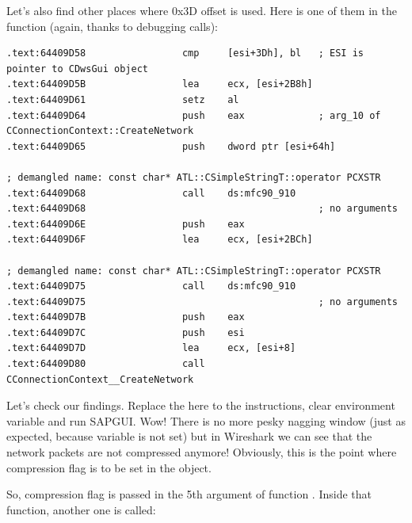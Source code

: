 {Let's also find other places where 0x3D offset is used. 
Here is one of them in the  function (again, thanks to debugging calls):}

\begin{lstlisting}
.text:64409D58                 cmp     [esi+3Dh], bl   ; ESI is pointer to CDwsGui object
.text:64409D5B                 lea     ecx, [esi+2B8h]
.text:64409D61                 setz    al
.text:64409D64                 push    eax             ; arg_10 of CConnectionContext::CreateNetwork
.text:64409D65                 push    dword ptr [esi+64h]

; demangled name: const char* ATL::CSimpleStringT::operator PCXSTR 
.text:64409D68                 call    ds:mfc90_910
.text:64409D68                                         ; no arguments
.text:64409D6E                 push    eax
.text:64409D6F                 lea     ecx, [esi+2BCh]

; demangled name: const char* ATL::CSimpleStringT::operator PCXSTR 
.text:64409D75                 call    ds:mfc90_910
.text:64409D75                                         ; no arguments
.text:64409D7B                 push    eax
.text:64409D7C                 push    esi
.text:64409D7D                 lea     ecx, [esi+8]
.text:64409D80                 call    CConnectionContext__CreateNetwork
\end{lstlisting}

{Let's check our findings. Replace the  here to the  instructions,
clear \TDWNC 
environment variable and run SAPGUI. Wow! There is no more pesky nagging window (just as expected, 
because variable is not set) but in Wireshark we can see that the network packets are not compressed anymore! 
Obviously, this is the point where compression flag is to be set in the  object.}

{So, compression flag is passed in the 5th argument of function . 
Inside that function, another one is called:}

